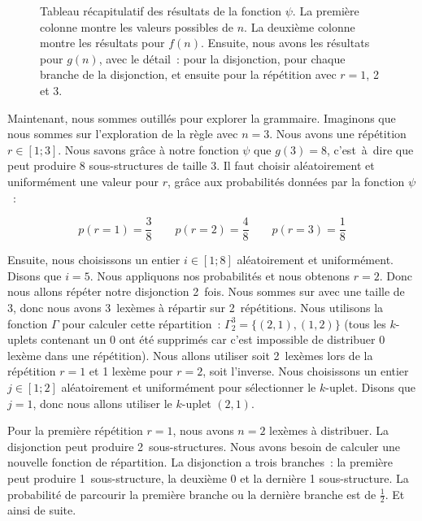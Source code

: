 \begin{example}
\begin{figure}
\caption{\label{figure:data:random_tabular} Tableau récapitulatif des résultats
de la fonction $\psi$. La première colonne montre les valeurs possibles de $n$.
La deuxième colonne montre les résultats pour $f(n)$. Ensuite, nous avons les
résultats pour $g(n)$, avec le détail~: pour la disjonction, pour chaque branche
de la disjonction, et ensuite pour la répétition avec $r = 1$, 2 et 3.}

\end{figure}

Maintenant, nous sommes outillés pour explorer la grammaire. Imaginons que nous
sommes sur l'exploration de la règle  avec $n = 3$. Nous avons une
répétition $r \in [1; 3]$. Nous savons grâce à notre fonction $\psi$ que $g(3) =
8$, c'est~à~dire que  peut produire 8 sous-structures de taille 3. Il
faut choisir aléatoirement et uniformément une valeur pour $r$, grâce aux
probabilités données par la fonction $\psi$~:

$$
p(r = 1) = \frac{3}{8} \qquad
p(r = 2) = \frac{4}{8} \qquad
p(r = 3) = \frac{1}{8}
$$

Ensuite, nous choisissons un entier $i \in [1; 8]$ aléatoirement et
uniformément. Disons que $i = 5$. Nous appliquons nos probabilités et nous
obtenons $r = 2$.
%
%
%
%
%
%
%
%
Donc nous allons répéter notre disjonction 2~fois. Nous sommes sur  avec
une taille de 3, donc nous avons 3~lexèmes à répartir sur 2~répétitions. Nous
utilisons la fonction $\Gamma$ pour calculer cette répartition~: $\Gamma_2^3 =
\{(2, 1), (1, 2)\}$ (tous les $k$-uplets contenant un 0 ont été supprimés car
c'est impossible de distribuer 0 lexème dans une répétition). Nous allons
utiliser soit 2~lexèmes lors de la répétition $r = 1$ et 1 lexème pour $r = 2$,
soit l'inverse. Nous choisissons un entier $j \in [1; 2]$ aléatoirement et
uniformément pour sélectionner le $k$-uplet. Disons que $j = 1$, donc nous
allons utiliser le $k$-uplet $(2, 1)$.

Pour la première répétition $r = 1$, nous avons $n = 2$ lexèmes à distribuer. La
disjonction peut produire 2~sous-structures. Nous avons besoin de calculer une
nouvelle fonction de répartition. La disjonction a trois branches~: la première
peut produire 1~sous-structure, la deuxième 0 et la dernière 1 sous-structure.
La probabilité de parcourir la première branche ou la dernière branche est de
$\tfrac{1}{2}$. Et ainsi de suite.

\end{example}

